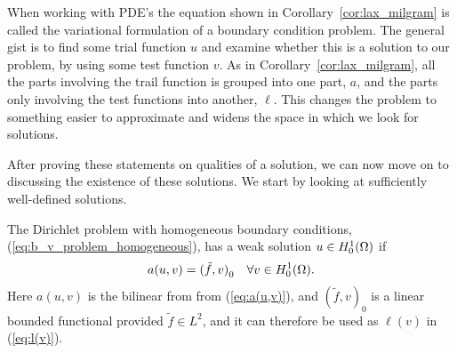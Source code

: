 When working with PDE's the equation shown in Corollary~\ref{cor:lax_milgram} 
is called the variational formulation of a boundary condition problem. 
The general gist is to find some trial function $u$ and examine whether this 
is a solution to our problem, by using some test function $v$. 
As in Corollary~\ref{cor:lax_milgram}, all the parts involving the trail function 
is grouped into one part, $a$, and the parts only involving the test functions into 
another, $\ell$.
This changes the problem to something easier to approximate and widens the 
space in which we look for solutions.

After proving these statements on qualities of a solution, we can now move 
on to discussing the existence of these solutions. We start by looking at 
sufficiently well-defined solutions. 
\begin{defn}{\quad}
    The Dirichlet problem with homogeneous boundary conditions,
     (\ref{eq:b_v_problem_homogeneous}), has a weak solution $u\in H_0^1(\Omega)$
     if 
     \begin{equation*}
        a(u,v) = {(\tilde{f},v)}_0 \quad \forall v \in H_0^1(\Omega).
     \end{equation*}
     Here $a(u,v)$ is the bilinear from from (\ref{eq:a(u,v)}), 
     and ${(\tilde{f},v)}_0$ is a linear bounded functional provided $\tilde{f}\in L^2$, and it can therefore be used as $\ell(v)$ in (\ref{eq:l(v)}).
\end{defn}




